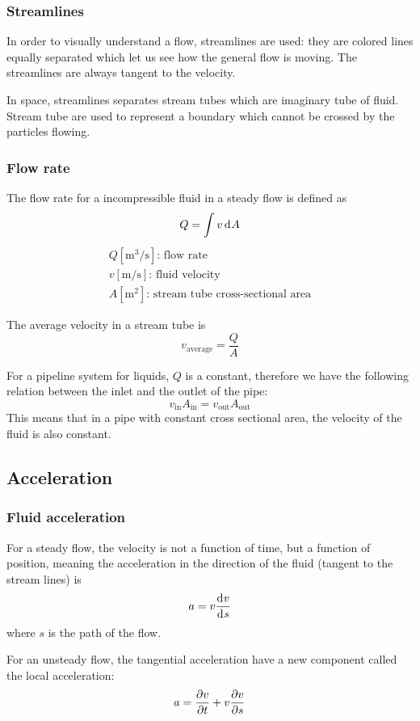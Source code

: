 \documentclass[10pt, twocolumn]{article}
\begin{document}
\subsubsection{Streamlines}
In order to visually understand a flow, streamlines are used: they are colored lines equally separated which let us see how the general flow is moving.
The streamlines are always tangent to the velocity.

In space, streamlines separates stream tubes which are imaginary tube of fluid.
Stream tube are used to represent a boundary which cannot be crossed by the particles flowing.


\subsubsection{Flow rate}
The flow rate for a incompressible fluid in a steady flow is defined as
\[
  Q = \int{v \,\mathrm{d}^{} A}
\]
\[
  \begin{array}{|l}
    Q [\si{\metre\cubed\per\second}] \text{: flow rate} \\
    v [\si{\metre\per\second}] \text{: fluid velocity}  \\
    A [\si{\metre\squared}] \text{: stream tube cross-sectional area}
  \end{array}
\]

The average velocity in a stream tube is
\[
  v_\mathrm{average} = \frac{Q}{A}
\]

For a pipeline system for liquids, \(Q\) is a constant, therefore we have the following relation between the inlet and the outlet of the pipe:
\[
  v_\mathrm{in}A_\mathrm{in} = v_\mathrm{out}A_\mathrm{out}
\]
This means that in a pipe with constant cross sectional area, the velocity of the fluid is also constant.

\subsection{Acceleration}
\subsubsection{Fluid acceleration}
For a steady flow, the velocity is not a function of time, but a function of position, meaning the acceleration in the direction of the fluid (tangent to the stream lines) is
\[
  a = v \frac{\mathrm{d}^{} v}{\mathrm{d}^{} s}
\]
where \(s\) is the path of the flow.

For an unsteady flow, the tangential acceleration have a new component called the local acceleration:
\[
  a = \frac{\partial v}{\partial t} + v\frac{\partial v}{\partial s}
\]
\end{document}
